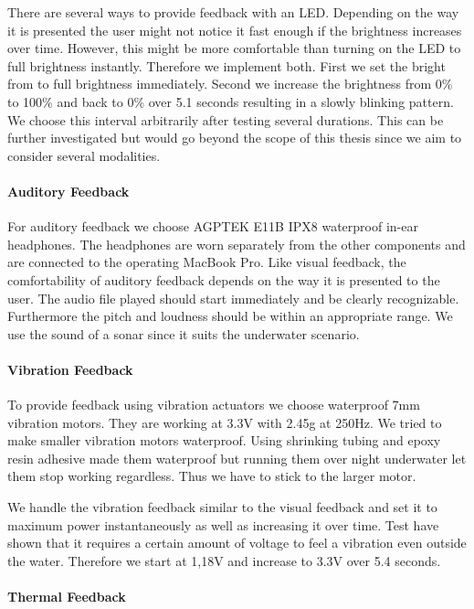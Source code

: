 There are several ways to provide feedback with an LED.
Depending on the way it is presented the user might not notice it fast enough if the brightness increases over time.
However, this might be more comfortable than turning on the LED to full brightness instantly.
Therefore we implement both.
First we set the bright from to full brightness immediately.
Second we increase the brightness from 0\% to 100\%  and back to 0\% over 5.1 seconds resulting in a slowly blinking pattern.
We choose this interval arbitrarily after testing several durations.
This can be further investigated but would go beyond the scope of this thesis since we aim to consider several modalities.


\paragraph{Auditory Feedback}

For auditory feedback we choose AGPTEK E11B IPX8 waterproof in-ear headphones.
The headphones are worn separately from the other components and are connected to the operating MacBook Pro.
Like visual feedback, the comfortability of auditory feedback depends on the way it is presented to the user. 
The audio file played should start immediately and be clearly recognizable.
Furthermore the pitch and loudness should be within an appropriate range.
We use the sound of a sonar since it suits the underwater scenario.


\paragraph{Vibration Feedback}

To provide feedback using vibration actuators we choose waterproof 7mm vibration motors.
They are working at 3.3V with 2.45g at 250Hz.
We tried to make smaller vibration motors waterproof.
Using shrinking tubing and epoxy resin adhesive made them waterproof but running them over night underwater let them stop working regardless.
Thus we have to stick to the larger motor.

We handle the vibration feedback similar to the visual feedback and set it to maximum power instantaneously as well as increasing it over time.
Test have shown that it requires a certain amount of voltage to feel a vibration even outside the water.
Therefore we start at 1,18V and increase to 3.3V over 5.4 seconds.


\paragraph{Thermal Feedback}

